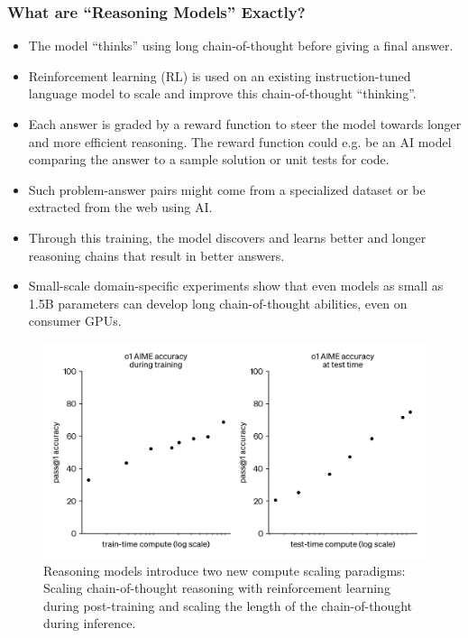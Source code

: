 \documentclass[aspectratio=169]{beamer}
\begin{document}
    \begin{frame}
        \frametitle{What are ``Reasoning Models'' Exactly?}
        \begin{itemize}
            \item The model ``thinks'' using long chain-of-thought before giving a final answer.
            \item Reinforcement learning (RL) is used on an existing instruction-tuned language model to scale and improve this chain-of-thought ``thinking''.
            \item Each answer is graded by a reward function to steer the model towards longer and more efficient reasoning.
            The reward function could e.g. be an AI model comparing the answer to a sample solution or unit tests for code.~\parencite{kimiteam2025kimik15scalingreinforcement}
            \item Such problem-answer pairs might come from a specialized dataset or be extracted from the web using AI.~\parencite{yeo2025demystifyinglongchainofthoughtreasoning}
            \item Through this training, the model discovers and learns better and longer reasoning chains that result in better answers.
            \item Small-scale domain-specific experiments show that even models as small as 1.5B parameters can develop long chain-of-thought abilities, even on consumer GPUs.~\parencite{tinyzero2025, unsloth_train_2025}
        \end{itemize}
    \end{frame}
    \begin{frame}
        \begin{figure}
            \includegraphics[height=0.45\textwidth]{images/o1-scaling-laws}
            \caption{Reasoning models introduce two new compute scaling paradigms: Scaling chain-of-thought reasoning with reinforcement learning during post-training and scaling the length of the chain-of-thought during inference.~\parencite{openai_learning_to_reason_with_llms_2024}}
        \end{figure}
    \end{frame}
\end{document}
